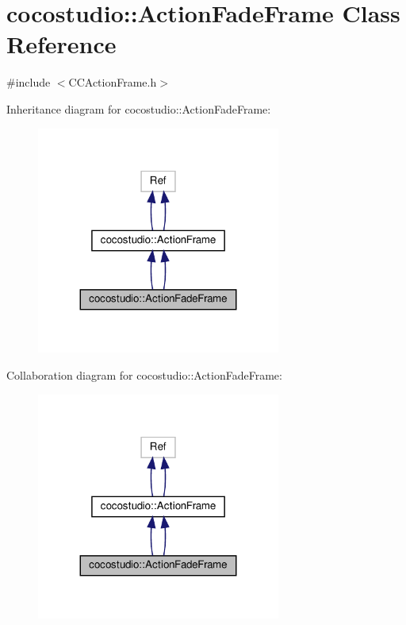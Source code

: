 \hypertarget{classcocostudio_1_1ActionFadeFrame}{}\section{cocostudio\+:\+:Action\+Fade\+Frame Class Reference}
\label{classcocostudio_1_1ActionFadeFrame}


{\ttfamily \#include $<$C\+C\+Action\+Frame.\+h$>$}



Inheritance diagram for cocostudio\+:\+:Action\+Fade\+Frame\+:
\nopagebreak
\begin{figure}[H]
\begin{center}
\leavevmode
\includegraphics[width=227pt]{classcocostudio_1_1ActionFadeFrame__inherit__graph}
\end{center}
\end{figure}


Collaboration diagram for cocostudio\+:\+:Action\+Fade\+Frame\+:
\nopagebreak
\begin{figure}[H]
\begin{center}
\leavevmode
\includegraphics[width=227pt]{classcocostudio_1_1ActionFadeFrame__coll__graph}
\end{center}
\end{figure}
